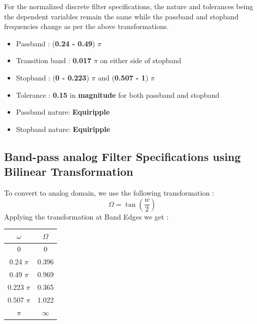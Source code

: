 \documentclass{article}
\begin{document}
\vspace{1em}
\noindent
For the normalized discrete filter specifications, the nature and tolerances being the dependent variables remain the same while the passband and stopband frequencies change as per the above transformations. 
\begin{itemize}
    \item Passband : (\textbf{0.24 -  0.49}) {$\pi$}
    \item  Transition band : \textbf{0.017} $\pi$ on either side of stopband
    \item Stopband : (\textbf{0 - 0.223}) {$\pi$} and (\textbf{0.507 - 1}) {$\pi$}
    \item  Tolerance : \textbf{0.15} in \textbf{magnitude} for both passband and stopband
    \item Passband nature: \textbf{Equiripple}
    \item Stopband nature: \textbf{Equiripple}
\end{itemize}


\subsection{Band-pass analog Filter Specifications using Bilinear
Transformation}
To convert to analog domain, we use the following transformation :
\begin{equation*}
    \Omega = \tan (\frac{w}{2})
\end{equation*}
Applying the transformation at Band Edges we get :
\begin{table}[H]
		\begin{center}
		\begin{tabular}{|c|c|}
			\hline
			$\omega$ & $\Omega$\\
			
			\hline
                0 & 0\\
                \hline
                0.24 $\pi$ & 0.396 \\
                \hline
                0.49 $\pi$ & 0.969\\
                \hline
                0.223 $\pi$ & 0.365\\
                \hline
                0.507 $\pi$ & 1.022\\
                \hline
                $\pi$ & $\infty$\\
                \hline
            
		\end{tabular}
		\end{center}
\end{table}
\end{document}

